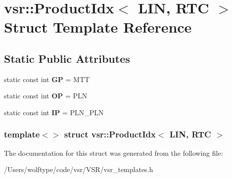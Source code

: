 \hypertarget{structvsr_1_1_product_idx_3_01_l_i_n_00_01_r_t_c_01_4}{\section{vsr\-:\-:Product\-Idx$<$ L\-I\-N, R\-T\-C $>$ Struct Template Reference}
\label{structvsr_1_1_product_idx_3_01_l_i_n_00_01_r_t_c_01_4}
}
\subsection*{Static Public Attributes}
\begin{DoxyCompactItemize}
\item 
\hypertarget{structvsr_1_1_product_idx_3_01_l_i_n_00_01_r_t_c_01_4_a950689ce358d2b468f17ada639036055}{static const int {\bfseries G\-P} = M\-T\-T}\label{structvsr_1_1_product_idx_3_01_l_i_n_00_01_r_t_c_01_4_a950689ce358d2b468f17ada639036055}

\item 
\hypertarget{structvsr_1_1_product_idx_3_01_l_i_n_00_01_r_t_c_01_4_a3e8911aaa1031147a139e0f1aceba90b}{static const int {\bfseries O\-P} = P\-L\-N}\label{structvsr_1_1_product_idx_3_01_l_i_n_00_01_r_t_c_01_4_a3e8911aaa1031147a139e0f1aceba90b}

\item 
\hypertarget{structvsr_1_1_product_idx_3_01_l_i_n_00_01_r_t_c_01_4_a26b7a805a35b5c206baf92db15157cc9}{static const int {\bfseries I\-P} = P\-L\-N\-\_\-\-P\-L\-N}\label{structvsr_1_1_product_idx_3_01_l_i_n_00_01_r_t_c_01_4_a26b7a805a35b5c206baf92db15157cc9}

\end{DoxyCompactItemize}
\subsubsection*{template$<$$>$ struct vsr\-::\-Product\-Idx$<$ L\-I\-N, R\-T\-C $>$}



The documentation for this struct was generated from the following file\-:\begin{DoxyCompactItemize}
\item 
/\-Users/wolftype/code/vsr/\-V\-S\-R/vsr\-\_\-templates.\-h\end{DoxyCompactItemize}
